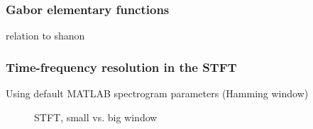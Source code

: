 \documentclass{beamer}
\begin{document}
\begin{frame}
	\frametitle{Gabor elementary functions}
	relation to shanon
\end{frame}

\begin{frame}
	\frametitle{Time-frequency resolution in the STFT}
	Using default MATLAB spectrogram parameters (Hamming window)
	\begin{figure}
		\vspace{-1em}
		\centering
		\caption{STFT, small vs. big window}
	\end{figure}
\end{frame}
\end{document}

